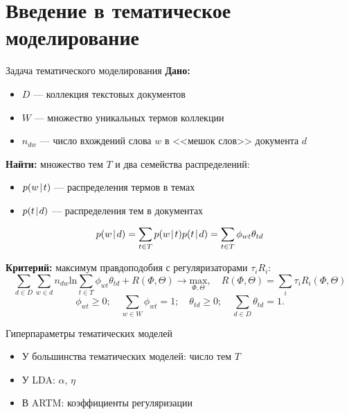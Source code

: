 \section{Введение в тематическое моделирование}
\begin{frame}[t]{Задача тематического моделирования}
\textbf{Дано:}
\begin{itemize}
    \item $D$ --- коллекция текстовых документов
    \item $W$ --- множество уникальных термов коллекции
    \item $n_{dw}$ --- число вхождений слова $w$ в <<мешок слов>> документа $d$
\end{itemize}

\medskip
\textbf{Найти:}
множество тем $T$ и два семейства распределений:
\smallskip
\begin{itemize}
    \item $p(w \mspace{2mu}{|}\mspace{2mu} t)$ --- распределения термов в темах
    \item $p(t \mspace{2mu}{|}\mspace{2mu} d)$ --- распределения тем в документах
\end{itemize}

\[
p(w \mspace{2mu}{|}\mspace{2mu} d) = \sum_{t \in T} p(w \mspace{2mu}{|}\mspace{2mu} t)p(t \mspace{2mu}{|}\mspace{2mu} d) = \sum_{t \in T} \phi_{wt}\theta_{td}
\]

\smallskip
\textbf{Критерий:} максимум правдоподобия с регуляризаторами $\tau_i R_i$:
\[
    \sum_{d \in D} \sum_{w \in d} n_{dw} \mathrm{ln} \sum_{t \in T} \phi_{wt} \theta_{td} + R(\Phi, \Theta) \rightarrow \underset{\Phi, \Theta}{\mathrm{max}}, \quad R(\Phi, \Theta) = \sum_{i} \tau_i R_i(\Phi, \Theta)
\]
\[
\phi_{wt} \ge 0; \quad \sum_{w \in W} \phi_{wt} = 1; \quad \theta_{td} \ge 0; \quad \sum_{d \in D} \theta_{td} = 1.
\]
\bigskip

\end{frame}

\begin{frame}{Гиперпараметры тематических моделей}
\begin{itemize}
    \item У большинства тематических моделей: число тем $T$
    \item У LDA: $\alpha$, $\eta$
    \item В ARTM: коэффициенты регуляризации
\end{itemize}
\end{frame}

